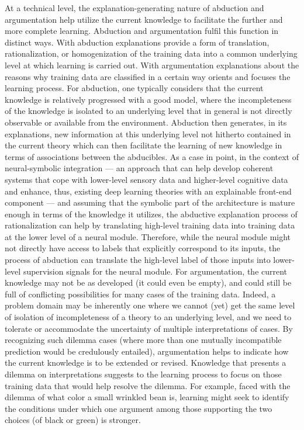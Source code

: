 At a technical level, the explanation-generating nature of abduction and argumentation help utilize the current knowledge to facilitate the further and more complete learning. Abduction and argumentation fulfil this function in distinct ways. With abduction explanations provide a form of translation, rationalization, or homogenization of the training data into a common underlying level at which learning is carried out. With argumentation explanations about the reasons why training data are classified in a certain way orients and focuses the learning process.
For abduction, one typically considers that the current knowledge is relatively progressed with a good model, where the incompleteness of the knowledge is isolated to an underlying level that in general is not directly observable or available from the environment. Abduction then generates, in its explanations, new information at this underlying level not hitherto contained in the current theory which can then facilitate the learning of new knowledge in terms of associations between the abducibles. As a case in point, in the context of neural-symbolic integration --- an approach that can help develop coherent systems that cope with lower-level sensory data and higher-level cognitive data and enhance, thus, existing deep learning theories with an explainable front-end component --- and assuming that the symbolic part of the architecture is mature enough in terms of the knowledge it utilizes, the abductive explanation process of rationalization can help by translating high-level training data into training data at the lower level of a neural module. Therefore, while the neural module might not directly have access to labels that explicitly correspond to its inputs, the process of abduction can translate the high-level label of those inputs into lower-level supervision signals for the neural module.
For argumentation, the current knowledge may not be as developed (it could even be empty), and could still be full of conflicting possibilities for many cases of the training data. Indeed, a problem domain may be inherently one where we cannot (yet) get the same level of isolation of incompleteness of a theory to an underlying level, and we need to tolerate or accommodate the uncertainty of multiple interpretations of cases. By recognizing such dilemma cases (where more than one mutually incompatible prediction would be credulously entailed), argumentation helps to indicate how the current knowledge is to be extended or revised. Knowledge that presents a dilemma on interpretations suggests to the learning process to focus on those training data that would help resolve the dilemma. For example, faced with the dilemma of what color a small wrinkled bean is, learning might seek to identify the conditions under which one argument among those supporting the two choices (of black or green) is stronger.
